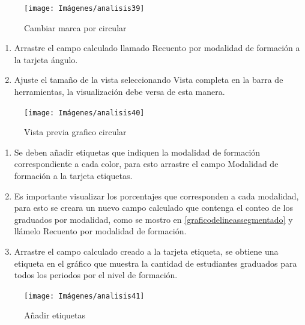 \documentclass[
]{book}
\begin{document}
\begin{figure}

{\centering \texttt{[image: Imágenes/analisis39]} 

}

\caption{Cambiar marca por circular}\label{fig:cambiarmarcaparagraficotorta-fig}
\end{figure}

\begin{enumerate}
\def\labelenumi{\arabic{enumi}.}
\setcounter{enumi}{3}
\item
  Arrastre el campo calculado llamado Recuento por modalidad de formación a la tarjeta ángulo.
\item
  Ajuste el tamaño de la vista seleccionando Vista completa en la barra de herramientas, la visualización debe versa de esta manera.
\end{enumerate}

\begin{figure}

{\centering \texttt{[image: Imágenes/analisis40]} 

}

\caption{Vista previa grafico circular}\label{fig:graficocircular-fig}
\end{figure}

\begin{enumerate}
\def\labelenumi{\arabic{enumi}.}
\setcounter{enumi}{5}
\item
  Se deben añadir etiquetas que indiquen la modalidad de formación correspondiente a cada color, para esto arrastre el campo Modalidad de formación a la tarjeta etiquetas.
\item
  Es importante visualizar los porcentajes que corresponden a cada modalidad, para esto se creara un nuevo campo calculado que contenga el conteo de los graduados por modalidad, como se mostro en \ref{graficodelineassegmentado} y llámelo Recuento por modalidad de formación.
\item
  Arrastre el campo calculado creado a la tarjeta etiqueta, se obtiene una etiqueta en el gráfico que muestra la cantidad de estudiantes graduados para todos los periodos por el nivel de formación.
\end{enumerate}

\begin{figure}

{\centering \texttt{[image: Imágenes/analisis41]} 

}

\caption{Añadir etiquetas}\label{fig:paso8graficocircular-fig}
\end{figure}
\end{document}
